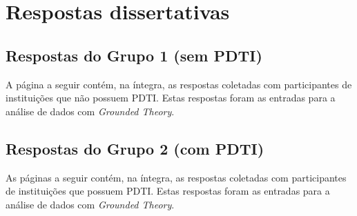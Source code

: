 \chapter{Respostas dissertativas} %
\label{apendice:d_respostas_disserta}

\section{Respostas do Grupo 1 (sem PDTI)}
A página a seguir contém, na íntegra, as respostas coletadas com participantes de instituições que não possuem PDTI. Estas respostas foram as entradas para a análise de dados com \textit{Grounded Theory}.


\section{Respostas do Grupo 2 (com PDTI)}
As páginas a seguir contém, na íntegra, as respostas coletadas com participantes de instituições que possuem PDTI. Estas respostas foram as entradas para a análise de dados com \textit{Grounded Theory}.

